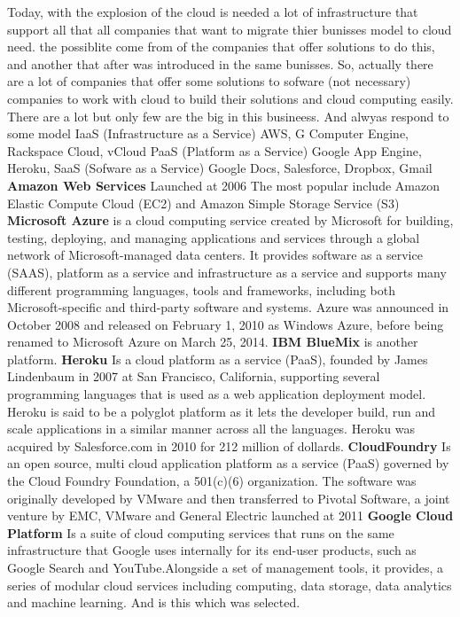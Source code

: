 Today, with the explosion of the cloud is needed a lot of infrastructure that support
all that all companies that want to migrate thier bunisses model to cloud need. the possiblite
come from of the companies that offer solutions to do this, and another that after
was introduced in the same bunisses.
So, actually there are a lot of companies that offer some solutions to sofware (not necessary)
companies to work with cloud to build their solutions and cloud computing easily.
\intro
There are a lot but only few are the big in this busineess. And alwyas respond to some
model IaaS (Infrastructure as a Service)
AWS, G Computer Engine, Rackspace Cloud, vCloud PaaS (Platform as a Service)
Google App Engine, Heroku, SaaS (Sofware as a Service) Google Docs, Salesforce, Dropbox, Gmail
\intro
\textbf{Amazon Web Services}
\intro
Launched at 2006 The most popular include Amazon Elastic
Compute Cloud (EC2) and Amazon Simple Storage Service (S3)
\intro
\textbf{Microsoft Azure}
\intro
is a cloud computing service created by Microsoft for building, testing, deploying,
and managing applications and services through a global network of Microsoft-managed
data centers. It provides software as a service (SAAS), platform as a service and
infrastructure as a service and supports many different programming languages,
tools and frameworks, including both Microsoft-specific and third-party software and systems.
Azure was announced in October 2008 and released on February 1, 2010 as Windows
 Azure, before being renamed to Microsoft Azure on March 25, 2014.
\intro
\textbf{IBM BlueMix}
\intro
is another platform.
\intro
\textbf{Heroku}
\intro
Is a cloud platform as a service (PaaS), founded by James Lindenbaum in 2007 at
 San Francisco, California, supporting several programming languages that is used
 as a web application deployment model.
 Heroku is said to be a polyglot platform as it lets the developer build,
 run and scale applications in a similar manner across all the languages.
 Heroku was acquired by Salesforce.com in 2010 for 212 million of dollards.
\intro
\textbf{CloudFoundry}
\intro Is an open source, multi cloud application platform as a service
(PaaS) governed by the Cloud Foundry Foundation, a 501(c)(6) organization.
The software was originally developed by VMware and then transferred to Pivotal Software,
a joint venture by EMC, VMware and General Electric launched at 2011
\intro
\textbf{Google Cloud Platform}
\intro Is a suite of cloud computing services
that runs on the same infrastructure that Google uses internally for its end-user
products, such as Google Search and YouTube.Alongside a set of management tools,
it provides, a series of modular cloud services including computing, data storage,
data analytics and machine learning.
\intro
And is this which was selected.


